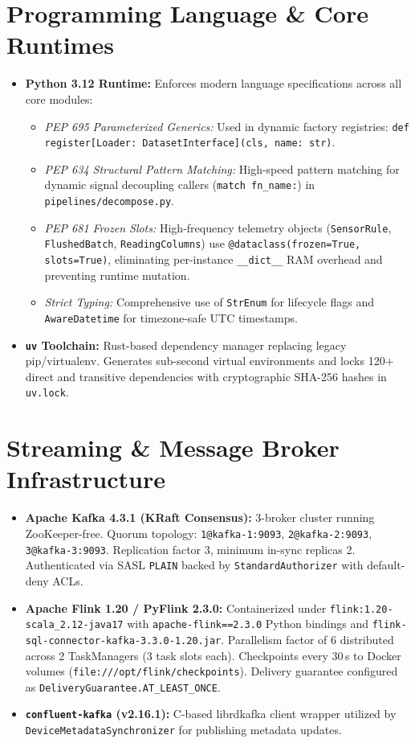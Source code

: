 \documentclass[10pt,a4paper]{report}
\begin{document}
\section{Programming Language \& Core Runtimes}
\begin{itemize}[leftmargin=*]
  \item \textbf{Python 3.12 Runtime:} Enforces modern language specifications across all core modules:
  \begin{itemize}
    \item \textit{PEP 695 Parameterized Generics:} Used in dynamic factory registries: \lstinline{def register[Loader: DatasetInterface](cls, name: str)}.
    \item \textit{PEP 634 Structural Pattern Matching:} High-speed pattern matching for dynamic signal decoupling callers (\lstinline{match fn_name:}) in \texttt{pipelines/decompose.py}.
    \item \textit{PEP 681 Frozen Slots:} High-frequency telemetry objects (\texttt{SensorRule}, \texttt{FlushedBatch}, \texttt{ReadingColumns}) use \lstinline{@dataclass(frozen=True, slots=True)}, eliminating per-instance \lstinline{__dict__} RAM overhead and preventing runtime mutation.
    \item \textit{Strict Typing:} Comprehensive use of \texttt{StrEnum} for lifecycle flags and \texttt{AwareDatetime} for timezone-safe UTC timestamps.
  \end{itemize}
  \item \textbf{\texttt{uv} Toolchain:} Rust-based dependency manager replacing legacy pip/virtualenv. Generates sub-second virtual environments and locks 120+ direct and transitive dependencies with cryptographic SHA-256 hashes in \texttt{uv.lock}.
\end{itemize}

\section{Streaming \& Message Broker Infrastructure}
\begin{itemize}[leftmargin=*]
  \item \textbf{Apache Kafka 4.3.1 (KRaft Consensus):} 3-broker cluster running ZooKeeper-free. Quorum topology: \texttt{1@kafka-1:9093}, \texttt{2@kafka-2:9093}, \texttt{3@kafka-3:9093}. Replication factor 3, minimum in-sync replicas 2. Authenticated via SASL \texttt{PLAIN} backed by \texttt{StandardAuthorizer} with default-deny ACLs.
  \item \textbf{Apache Flink 1.20 / PyFlink 2.3.0:} Containerized under \texttt{flink:1.20-scala\_2.12-java17} with \texttt{apache-flink==2.3.0} Python bindings and \texttt{flink-sql-connector-kafka-3.3.0-1.20.jar}. Parallelism factor of 6 distributed across 2 TaskManagers (3 task slots each). Checkpoints every 30\,s to Docker volumes (\texttt{file:///opt/flink/checkpoints}). Delivery guarantee configured as \texttt{DeliveryGuarantee.AT\_LEAST\_ONCE}.
  \item \textbf{\texttt{confluent-kafka} (v2.16.1):} C-based librdkafka client wrapper utilized by \texttt{DeviceMetadataSynchronizer} for publishing metadata updates.
\end{itemize}
\end{document}
